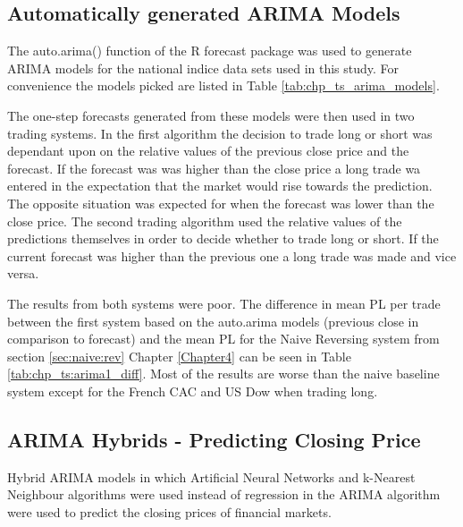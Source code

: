 \subsection{Automatically generated ARIMA Models}
The auto.arima() function of the R forecast package was used to generate ARIMA models for the national indice data sets used in this study. For convenience the models picked are listed in Table \ref{tab:chp_ts_arima_models}.



The one-step forecasts generated from these models were then used in two trading systems. In the first algorithm the decision to trade long or short was dependant upon on the relative values of the previous close price and the forecast. If the forecast was was higher than the close price a long trade wa entered in the expectation that the market would rise towards the prediction. The opposite situation was expected for when the forecast was lower than the close price. The second trading algorithm used the relative values of the predictions themselves in order to decide whether to trade long or short. If the current forecast was higher than the previous one a long trade was made and vice versa.

The results from both systems were poor. The difference in mean PL per trade between the first system based on the auto.arima models (previous close in comparison to forecast) and the mean PL for the Naive Reversing system from section \ref{sec:naive:rev} Chapter \ref{Chapter4} can be seen in Table \ref{tab:chp_ts:arima1_diff}. Most of the results are worse than the naive baseline system except for the French CAC and US Dow when trading long.



\subsection{ARIMA Hybrids - Predicting Closing Price}
Hybrid ARIMA models in which Artificial Neural Networks and k-Nearest Neighbour algorithms were used instead of regression in the ARIMA algorithm were used to predict the closing prices of financial markets. 

